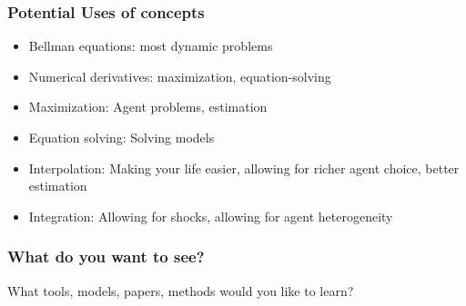\documentclass{beamer}
\begin{document}
\begin{frame}
\frametitle[alignment=center]{Potential Uses of concepts}
\begin{itemize}
\item Bellman equations: most dynamic problems
\bigskip
\item Numerical derivatives: maximization, equation-solving
\bigskip
\item Maximization: Agent problems, estimation
\bigskip
\item Equation solving: Solving models
\bigskip
\item Interpolation: Making your life easier, allowing for richer agent choice, better estimation
\bigskip
\item Integration: Allowing for shocks, allowing for agent heterogeneity
\end{itemize}
\end{frame}


\begin{frame}
\frametitle[alignment=center]{What do you want to see?}
 What tools, models, papers, methods would you like to learn?
\end{frame}
\end{document}
